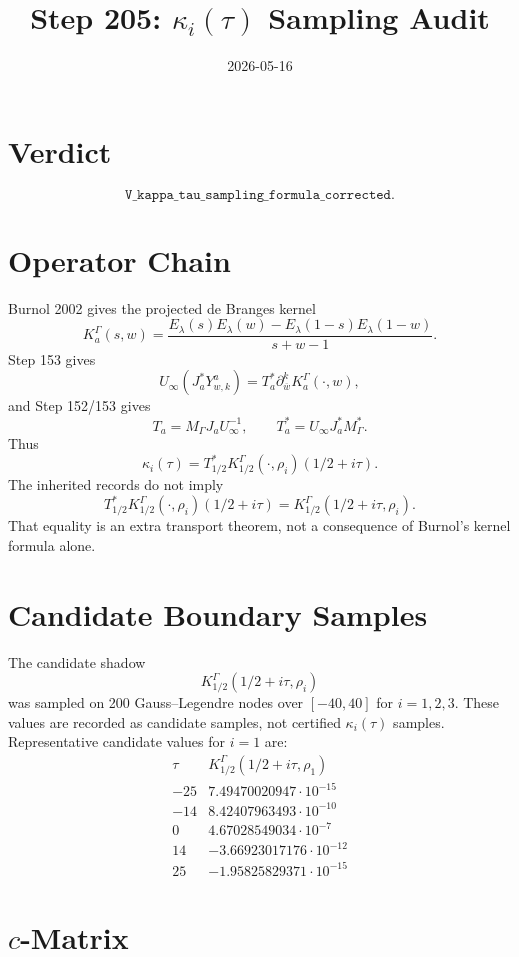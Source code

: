 \documentclass[11pt]{article}
\title{Step 205: \(\kappa_i(\tau)\) Sampling Audit}
\date{2026-05-16}
\begin{document}
\maketitle

\section*{Verdict}
\[
\boxed{\texttt{V\_kappa\_tau\_sampling\_formula\_corrected}.}
\]

\section*{Operator Chain}

Burnol 2002 gives the projected de Branges kernel
\[
K_a^\Gamma(s,w)=\frac{E_\lambda(s)E_\lambda(w)-E_\lambda(1-s)E_\lambda(1-w)}{s+w-1}.
\]
Step 153 gives
\[
U_\infty(J_a^*Y^a_{w,k})=
T_a^*\partial_{\overline w}^kK_a^\Gamma(\cdot,w),
\]
and Step 152/153 gives
\[
T_a=M_\Gamma J_aU_\infty^{-1},\qquad
T_a^*=U_\infty J_a^*M_\Gamma^*.
\]
Thus
\[
\kappa_i(\tau)=T_{1/2}^*K_{1/2}^{\Gamma}(\cdot,\rho_i)(1/2+i\tau).
\]
The inherited records do not imply
\[
T_{1/2}^*K_{1/2}^{\Gamma}(\cdot,\rho_i)(1/2+i\tau)
=K_{1/2}^{\Gamma}(1/2+i\tau,\rho_i).
\]
That equality is an extra transport theorem, not a consequence of Burnol's
kernel formula alone.

\section*{Candidate Boundary Samples}

The candidate shadow
\[
K_{1/2}^{\Gamma}(1/2+i\tau,\rho_i)
\]
was sampled on 200 Gauss--Legendre nodes over \([-40,40]\) for
\(i=1,2,3\).  These values are recorded as candidate samples, not certified
\(\kappa_i(\tau)\) samples.  Representative candidate values for \(i=1\) are:
\[
\begin{array}{c|c}
\tau & K_{1/2}^{\Gamma}(1/2+i\tau,\rho_1)\\
\hline
-25 & 7.49470020947\cdot10^{-15}\\
-14 & 8.42407963493\cdot10^{-10}\\
0 & 4.67028549034\cdot10^{-7}\\
14 & -3.66923017176\cdot10^{-12}\\
25 & -1.95825829371\cdot10^{-15}
\end{array}
\]

\section*{\(c\)-Matrix}
\end{document}
